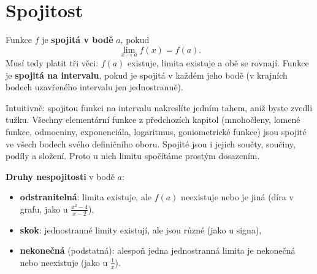 \section{Spojitost}\label{sec:spojitost}

\begin{definitionbox}
  Funkce $f$ je \textbf{spojitá v bodě} $a$, pokud
  \begin{equation*}
    \lim_{x\to a} f(x) = f(a).
  \end{equation*}
  Musí tedy platit tři věci: $f(a)$ existuje, limita existuje a obě se rovnají. Funkce je \textbf{spojitá na intervalu}, pokud je spojitá v každém jeho bodě (v krajních bodech uzavřeného intervalu jen jednostranně).
\end{definitionbox}

Intuitivně: spojitou funkci na intervalu nakreslíte jedním tahem, aniž byste zvedli tužku. Všechny elementární funkce z předchozích kapitol (mnohočleny, lomené funkce, odmocniny, exponenciála, logaritmus, goniometrické funkce) jsou spojité ve všech bodech svého definičního oboru. Spojité jsou i jejich součty, součiny, podíly a složení. Proto u nich limitu spočítáme prostým dosazením.

\begin{definitionbox}
  \textbf{Druhy nespojitosti} v bodě $a$:
  \begin{itemize}
    \item \textbf{odstranitelná}: limita existuje, ale $f(a)$ neexistuje nebo je jiná (díra v grafu, jako u $\frac{x^2 - 4}{x - 2}$),
    \item \textbf{skok}: jednostranné limity existují, ale jsou různé (jako u signa),
    \item \textbf{nekonečná} (podstatná): alespoň jedna jednostranná limita je nekonečná nebo neexistuje (jako u $\frac{1}{x}$).
  \end{itemize}
\end{definitionbox}

